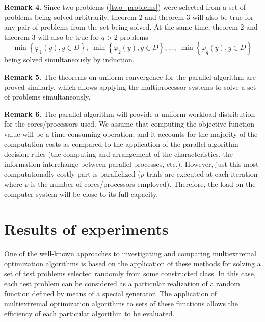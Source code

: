 \documentclass[smallcondensed]{svjour3}     %
\begin{document}
\textbf{Remark 4}. Since two problems (\ref{two_problems}) were selected from a set of problems being solved arbitrarily, theorem 2 and theorem 3 will also be true for any pair of problems from the set being solved. At the same time, theorem 2 and theorem 3 will also be true for $q>2$ problems 
\[
\min\left\{\varphi_1(y), y\in D \right\}, \; \min\left\{\varphi_2(y), y\in D\right\},..., \; \min\left\{\varphi_q(y), y\in D\right\}
\]
being solved simultaneously by induction.

\textbf{Remark 5}. The theorems on uniform convergence for the parallel algorithm are proved similarly, which allows applying the multiprocessor systems to solve a set of problems simultaneously.

\textbf{Remark 6}. The parallel algorithm will provide a uniform workload distribution for the cores/processors used. We assume that computing the objective function value will be a time-consuming operation, and it accounts for the majority of the computation costs as compared to the application of the parallel algorithm decision rules (the computing and arrangement of the characteristics, the information interchange between parallel processes, etc.). However, just this most computationally costly part is parallelized ($p$ trials are executed at each iteration where $p$ is the number of cores/processors employed). Therefore, the load on the computer system will be close to its full capacity.


\section{Results of experiments}

One of the well-known approaches to investigating and comparing multiextremal optimization algorithms is based on the application of these methods for solving a set of test problems selected randomly from some constructed class. In this case, each test problem can be considered as a particular realization of a random function defined by means of a special generator. The application of multiextremal optimization algorithms to sets of these functions allows the efficiency of each particular algorithm to be evaluated.
\end{document}
